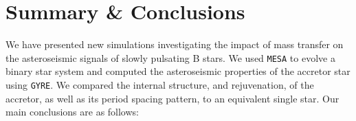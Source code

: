 \documentclass[twocolumn, twocolappendix, oneside]{aastex631}
\renewcommand{\bv}{Brunt–Väisälä\xspace}
\newcommand{\bvf}{Brunt–Väisälä frequency\xspace}
\newcommand{\mesa}{\texttt{MESA}\xspace}
\newcommand{\gyre}{\texttt{GYRE}\xspace}
\begin{document}


\section{Summary \& Conclusions} \label{sec:conclusion}

We have presented new simulations investigating the impact of mass transfer on the asteroseismic signals of slowly pulsating B stars. We used \mesa to evolve a binary star system and computed the asteroseismic properties of the accretor star using \gyre. We compared the internal structure, and rejuvenation, of the accretor, as well as its period spacing pattern, to an equivalent single star. Our main conclusions are as follows:
\end{document}
